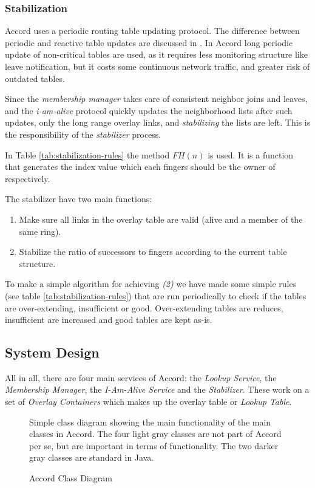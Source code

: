 \subsubsection{Stabilization}
\label{design:stabilization}

Accord uses a periodic routing table updating protocol. The
 difference between periodic and reactive table updates are discussed in
 \cite{rhea-04-handling-churn}. In Accord long periodic update of non-critical tables
 are used, as it requires less monitoring structure like leave notification, but it
 costs some continuous network traffic, and greater risk of outdated tables.

Since the \emph{membership manager} takes care of consistent neighbor joins and leaves,
 and the \emph{i-am-alive} protocol quickly updates the neighborhood lists after such
 updates, only the long range overlay links, and \emph{stabilizing} the lists are left.
 This is the responsibility of the \emph{stabilizer} process.

In Table \ref{tab:stabilization-rules} the method $FH(n)$ is used. It is a function that
 generates the index value which each fingers should be the owner of respectively.

The stabilizer have two main functions:
\begin{enumerate}
\item Make sure all links in the overlay table are valid (alive and a member of the same ring).
\item Stabilize the ratio of successors to fingers according to the current table structure.
\end{enumerate}

To make a simple algorithm for achieving \emph{(2)} we have made some simple rules (see table \ref{tab:stabilization-rules}) that are run periodically to check if the tables are over-extending, insufficient or good. Over-extending tables are reduces, insufficient are increased and good tables are kept as-is.

\subsection{System Design}
\label{degign:SystemDesign}

All in all, there are four main services of Accord: the \emph{Lookup Service}, the \emph{Membership Manager}, the \emph{I-Am-Alive Service} and the \emph{Stabilizer}. These work on a set of \emph{Overlay Containers} which makes up the overlay table or \emph{Lookup Table}.

\begin{figure}[htp] %
\centering
{}
\parbox{.9\linewidth}{
  Simple class diagram showing the main functionality of the main classes in Accord.
  The four light gray classes are not part of Accord per se, but are important in
  terms of functionality. The two darker gray classes are standard in Java.}
\caption{Accord Class Diagram}
\label{fig:domainmodel}
\end{figure}
